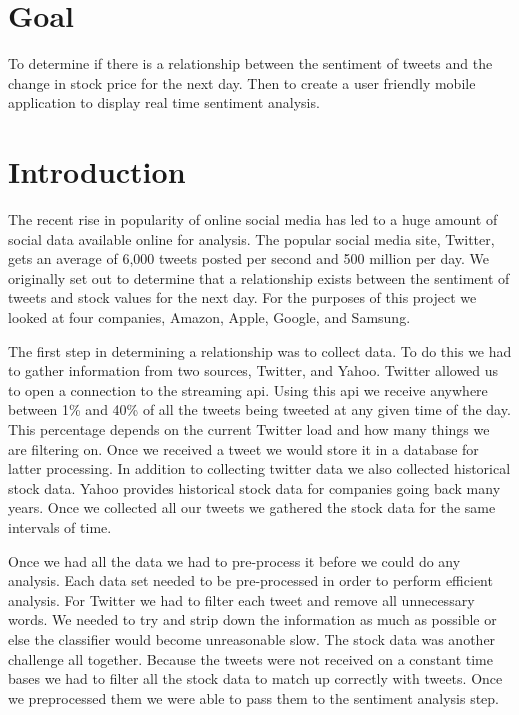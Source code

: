 \documentclass{acm_proc_article-sp}
\begin{document}
\section*{Goal}

To determine if there is a relationship between the sentiment of tweets and the
change in stock price for the next day. Then to create a user friendly mobile
application to display real time sentiment analysis.

\section{Introduction}

The recent rise in popularity of online social media has led to a huge amount
of social data available online for analysis. The popular social media site,
Twitter, gets an average of 6,000 tweets posted per second and 500 million per
day. We originally set out to determine that a relationship exists between the
sentiment of tweets and stock values for the next day. For the purposes of
this project we looked at four companies, Amazon, Apple, Google, and Samsung. 

The first step in determining a relationship was to collect data. To do this we had to gather information
from two sources, Twitter, and Yahoo. Twitter allowed us to open a connection
to the streaming api. Using this api we receive anywhere between 1\% and 40\%
of all the tweets being tweeted at any given time of the day. This percentage depends on the current Twitter
load and how many things we are filtering on. Once we received a tweet we would
store it in a database for latter processing.  In addition to collecting
twitter data we also collected historical stock data. Yahoo provides historical
stock data for companies going back many years. Once we collected all our
tweets we gathered the stock data for the same intervals of time.

Once we had all the data we had to pre-process it before we could do any
analysis. Each data set needed to be pre-processed in order to perform
efficient analysis. For Twitter we had to filter each tweet and
remove all unnecessary words. We needed to try and strip down the information
as much as possible or else the classifier would become unreasonable slow. The
stock data was another challenge all together. Because the tweets were not
received on a constant time bases we had to filter all the stock data to match
up correctly with tweets. Once we preprocessed them we were able to pass them to
the sentiment analysis step.
\end{document}
